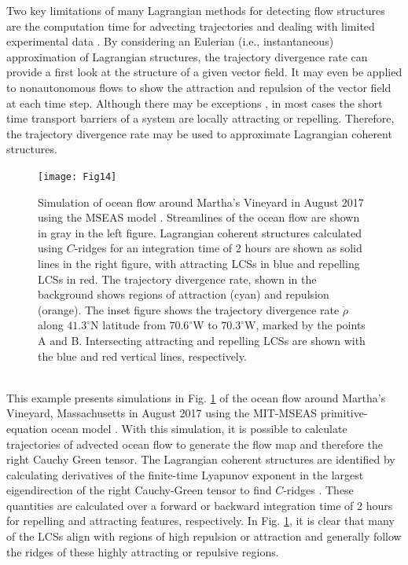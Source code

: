 \documentclass[twocolumn]{svjour3}
\begin{document}
Two key limitations of many Lagrangian methods for detecting flow structures are the computation time for advecting trajectories \cite{brunton2010fast,ameli2014development} and dealing with limited experimental data \cite{garth2007efficient}. By considering an Eulerian (i.e., instantaneous) approximation of Lagrangian structures, the trajectory divergence rate can provide a first look at the structure of a given vector field. It may even be applied to nonautonomous flows to show the attraction and repulsion of the vector field at each time step. Although there may be exceptions \cite{tallapragada2017globally}, in most cases the short time transport barriers of a system are locally attracting or repelling. Therefore, the trajectory divergence rate may be used to approximate Lagrangian coherent structures. 

\begin{figure}
\centering
\texttt{[image: Fig14]}
\caption{Simulation of ocean flow around Martha's Vineyard in August 2017 using the MSEAS model \cite{de2014relocatable}. Streamlines of the ocean flow are shown in gray in the left figure. Lagrangian coherent structures calculated using $C$-ridges \cite{schindler2012ridge} for an integration time of 2 hours are shown as solid lines in the right figure, with attracting LCSs in blue and repelling LCSs in red. The trajectory divergence rate, shown in the background shows regions of attraction (cyan) and repulsion (orange). The inset figure shows the trajectory divergence rate $\dot{\rho}$ along $41.3^\circ$N latitude from $70.6^\circ$W to $70.3^\circ$W, marked by the points A and B. Intersecting attracting and repelling LCSs are shown with the blue and red vertical lines, respectively.}
\label{fig:LCScomp}
\end{figure}

 \\
This example presents simulations in Fig. \ref{fig:LCScomp} of the ocean flow around Martha's Vineyard, Massachusetts in August 2017 using the MIT-MSEAS primitive-equation ocean model \cite{haley2010multiscale}. With this simulation, it is possible to calculate trajectories of advected ocean flow to generate the flow map and therefore the right Cauchy Green tensor. The Lagrangian coherent structures are identified by calculating derivatives of the finite-time Lyapunov exponent in the largest eigendirection of the right Cauchy-Green tensor to find $C$-ridges \cite{schindler2012ridge}. These quantities are calculated over a forward or backward integration time of 2 hours for repelling and attracting features, respectively. In Fig. \ref{fig:LCScomp}, it is clear that many of the LCSs align with regions of high repulsion or attraction and generally follow the ridges of these highly attracting or repulsive regions.
\end{document}

